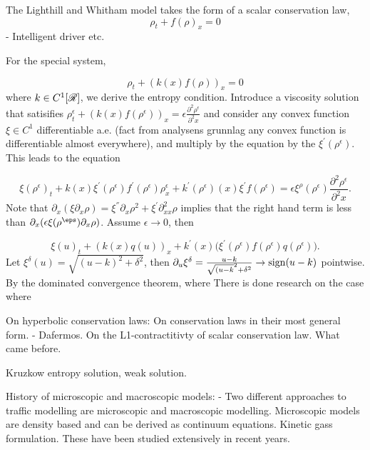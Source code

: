 The Lighthill and Whitham model takes the form of a scalar conservation law,
\begin{equation}
    \rho_t + f(\rho)_x = 0
\end{equation}
- Intelligent driver etc. 

For the special system, 

\begin{equation} \label{special inhom SCL}
    \rho_t + (k(x)f(\rho))_x = 0
\end{equation}
where $k \in C^1[\mathscr{R}]$, we derive the entropy condition. Introduce a viscosity solution that satisifies $\rho^{\epsilon}_t + (k(x)f(\rho^{\epsilon}))_x = \epsilon  \frac{\partial^2 \rho^\epsilon}{\partial^2x} $ and consider any convex function $\xi \in C^1$ differentiable a.e. (fact from analysens grunnlag any convex function is differentiable almost everywhere), and multiply by the equation by the $\xi^{'}(\rho^{\epsilon})$. This leads to the equation 

\begin{equation}
    \xi(\rho^{\epsilon})_t + k(x) \xi^{'}(\rho^{\epsilon}) f^{'}(\rho^{\epsilon})\rho^{\epsilon}_x + k^{'}(\rho^{\epsilon})(x)\xi^{'}f(\rho^{\epsilon}) = \epsilon \xi^{\rho}(\rho^{\epsilon}) \frac{\partial^2 \rho^\epsilon}{\partial^2x}. 
\end{equation}
Note that $\partial_x(\xi \partial_x \rho) = \xi^{''} \partial_x \rho^2 + \xi^{'}\partial^2_{xx}\rho$ implies that the right hand term is less than $\partial_x(\epsilon \xi(\rho^{\eps}) \partial_x \rho)$. Assume $\epsilon \to 0$, then 

\begin{equation}
    \xi(u)_t + (k(x)q(u))_x + k^{'}(x)\big( \xi^{'}(\rho^{\epsilon}) f(\rho^{\epsilon})  q(\rho^{\epsilon})\big).
\end{equation}
Let $\xi^\delta (u) = \sqrt{(u-k)^2 + \delta^2}$, then $\partial_u \xi^\delta = \frac{u - k}{\sqrt{(u - k}^2 + \delta ^2} \to \operatorname{sign}(u - k)$ pointwise. By the dominated convergence theorem, 
where There is done research on the case where 


On hyperbolic conservation laws: 
On conservation laws in their most general form. - Dafermos. 
On the L1-contractitivty of scalar conservation law. 
What came before. 

Kruzkow entropy solution, weak solution. 

History of microscopic and macroscopic models: 
- Two different approaches to traffic modelling are microscopic and macroscopic modelling. Microscopic models are density based and can be derived as continuum equations. Kinetic gass formulation.  These have been studied extensively in recent years. 

